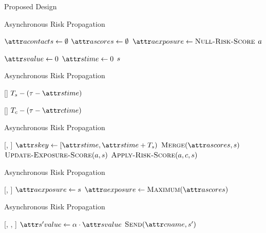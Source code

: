\documentclass[11pt]{beamer}
\begin{document}
\begin{section}{Proposed Design}
\begin{frame}{Asynchronous Risk Propagation}
\begin{function}{\nCreateActor}
  \State $\aActorContacts \assign \emptyset$
  \State $\aActorScores \assign \emptyset$
  \State $\aActorExposure \assign \cNullRiskScore$
  \State \Return $a$
\end{function}
\begin{function}{\nNullRiskScore}
  \State $\aScoreValue \assign 0$
  \State $\aScoreTime \assign 0$
  \State \Return $s$
\end{function}
\end{frame}

\begin{frame}{Asynchronous Risk Propagation}
\begin{function}{\nRiskScoreTtl}[\vScore]
  \State \Return $\pScoreExpiry - (\vReferenceTime - \aScoreTime)$
\end{function}
\begin{function}{\nContactTtl}[\vContact]
  \State \Return $\pContactExpiry - (\vReferenceTime - \aContactTime)$
\end{function}
\end{frame}

\begin{frame}{Asynchronous Risk Propagation}
\begin{function}{\nHandleRiskScore}[\vActor, \vScore]
    \pause
    \State $\aScoreKey \assign [\aScoreTime, \aScoreTime + \pScoreExpiry)$
    \pause
    \State $\cMerge[\aActorScores, \vScore]$
    \pause
    \State $\cUpdateExposureScore[\vActor, \vScore]$
    \pause
    \ForEach{$\vContact \in \aActorContacts$}
      \State $\cApplyRiskScore[\vActor, \vContact, \vScore]$
    \EndFor
  \EndIf
\end{function}
\end{frame}

\begin{frame}{Asynchronous Risk Propagation}
\begin{function}{\nUpdateExposureScore}[\vActor, \vScore]
  \If{$\aActorExposureValue < \aScoreValue$}
    \pause
    \State $\aActorExposure \assign \vScore$
  \pause
    \pause
    \State $\aActorExposure \assign \cMaximum[\aActorScores]$
  \EndIf
\end{function}
\end{frame}

\begin{frame}{Asynchronous Risk Propagation}
\begin{function}{\nApplyRiskScore}[\vActor, \vContact, \vScore]
  \If{$\aContactTime + \pTimeBuffer > \aScoreTime$}
    \pause
    \State $\aNewScoreValue \assign \pTransmissionRate \cdot \aScoreValue$
    \pause
    \State $\cSend[\aContactName, \vNewScore]$
  \EndIf
\end{function}
\end{frame}


\end{section}
\end{document}
